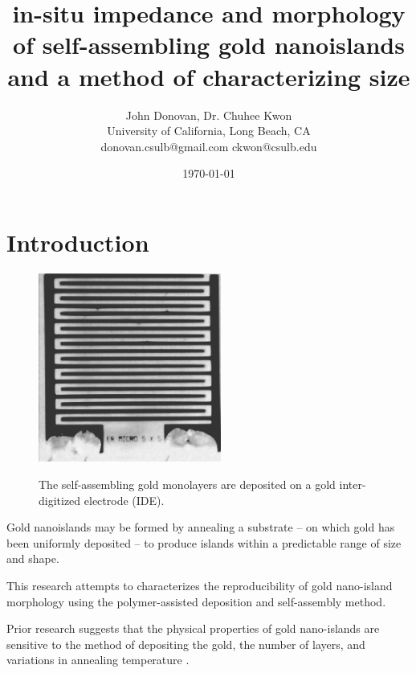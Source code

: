 \documentclass[12pt,oneside,english]{article}
\begin{document}

        \title{in-situ impedance and morphology of self-assembling gold nanoislands and a method of characterizing size}

    \author{John Donovan, Dr. Chuhee Kwon\\
    University of California, Long Beach, CA\\
    {\small donovan.csulb@gmail.com ckwon@csulb.edu}}
    
        \date{\today}

    \maketitle

    \tableofcontents
    \clearpage


    

    \section{Introduction}

    \begin{figure}
    \includegraphics[width=60mm]{images/IDE.eps} \label{f:IDE}
    \caption{The self-assembling gold monolayers are deposited on a gold inter-digitized electrode (IDE).}
    \end{figure}
    
    Gold nanoislands may be formed by annealing a substrate -- on which gold has been uniformly deposited -- to produce islands within a predictable range of size and shape.
    
    This research attempts to characterizes the reproducibility of gold nano-island morphology using the polymer-assisted deposition and self-assembly method.
    
    Prior research suggests that the physical properties of gold nano-islands are sensitive to the method of depositing the gold, the number of layers, and variations in annealing temperature \cite{shon11}.
\end{document}

